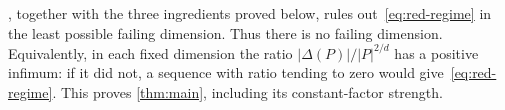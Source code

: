 , together with the three ingredients proved below, rules out~\eqref{eq:red-regime} in the least possible failing dimension. Thus there is no failing dimension. Equivalently, in each fixed dimension the ratio $|\Delta(P)|/|P|^{2/d}$ has a positive infimum: if it did not, a sequence with ratio tending to zero would give~\eqref{eq:red-regime}. This proves \cref{thm:main}, including its constant-factor strength.
